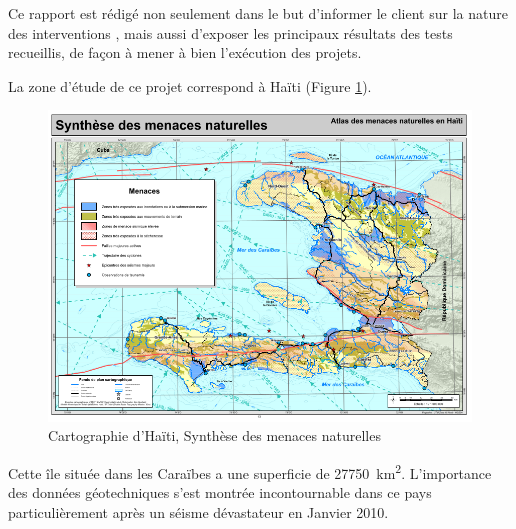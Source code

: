 Ce rapport est rédigé non seulement dans le but d’informer le client sur la nature des interventions
, mais aussi d’exposer les principaux résultats des tests recueillis, de façon à mener à bien
l’exécution des projets.
\par
La zone d'étude de ce projet correspond à Haïti (Figure \ref{fig:haiti}).
\begin{figure}
    \centering
    \includegraphics[width=1\textwidth]{images/Contexte/haiti.png}
    \caption{Cartographie d'Haïti, Synthèse des menaces naturelles  \cite{ciat}}
    \label{fig:haiti}
\end{figure}
Cette île située dans les Caraïbes a une superficie de  \SI{27750}{\kilo\metre\squared}\cite{superficie}.
L'importance des données géotechniques s'est montrée incontournable dans ce pays particulièrement 
après un séisme dévastateur en Janvier 2010.

